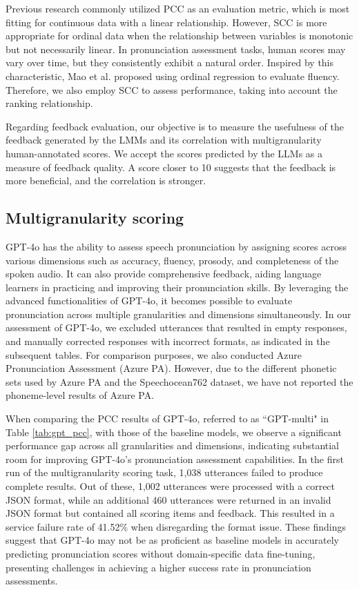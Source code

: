 \documentclass{Interspeech}
\begin{document}
Previous research \cite{zhang2021speechocean762, gong2022transformer,chao2023hierarchical} commonly utilized PCC as an evaluation metric, which is most fitting for continuous data with a linear relationship. However, SCC is more appropriate for ordinal data when the relationship between variables is monotonic but not necessarily linear. In pronunciation assessment tasks, human scores may vary over time, but they consistently exhibit a natural order. Inspired by this characteristic, Mao et al. \cite{mao2019nn} proposed using ordinal regression to evaluate fluency. Therefore, we also employ SCC to assess performance, taking into account the ranking relationship.

Regarding feedback evaluation, our objective is to measure the usefulness of the feedback generated by the LMMs and its correlation with multigranularity human-annotated scores. We accept the scores predicted by the LLMs as a measure of feedback quality. A score closer to 10 suggests that the feedback is more beneficial, and the correlation is stronger.

\subsection{Multigranularity scoring}

GPT-4o has the ability to assess speech pronunciation by assigning scores across various dimensions such as accuracy, fluency, prosody, and completeness of the spoken audio. It can also provide comprehensive feedback, aiding language learners in practicing and improving their pronunciation skills. By leveraging the advanced functionalities of GPT-4o, it becomes possible to evaluate pronunciation across multiple granularities and dimensions simultaneously. In our assessment of GPT-4o, we excluded utterances that resulted in empty responses, and manually corrected responses with incorrect formats, as indicated in the subsequent tables. For comparison purposes, we also conducted Azure Pronunciation Assessment (Azure PA). However, due to the different phonetic sets used by Azure PA and the Speechocean762 dataset, we have not reported the phoneme-level results of Azure PA.

When comparing the PCC results of GPT-4o, referred to as ``GPT-multi" in Table \ref{tab:gpt_pcc}, with those of the baseline models, we observe a significant performance gap across all granularities and dimensions, indicating substantial room for improving GPT-4o's pronunciation assessment capabilities. In the first run of the multigranularity scoring task, 1,038 utterances failed to produce complete results. Out of these, 1,002 utterances were processed with a correct JSON format, while an additional 460 utterances were returned in an invalid JSON format but contained all scoring items and feedback. This resulted in a service failure rate of 41.52\% when disregarding the format issue. These findings suggest that GPT-4o may not be as proficient as baseline models in accurately predicting pronunciation scores without domain-specific data fine-tuning, presenting challenges in achieving a higher success rate in pronunciation assessments.
\end{document}
